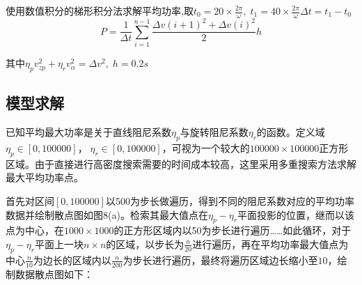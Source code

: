 \documentclass{article}
\numberwithin{equation}{subsection}
\begin{document}
使用数值积分的梯形积分法求解平均功率,取$t_0=20 \times \frac{2 \pi}{\omega}, \; t_{1}=40 \times \frac{2 \pi}{\omega}\Delta t=t_1-t_0$
\begin{equation}
P=\frac{1}{\Delta t}\sum\limits_{i=1}^{n-1}\frac{\Delta v(i+1)^2+\Delta v(i)^2}{2}h
\end{equation}

其中$\eta_p v_{zp}^2+\eta_r v_{\alpha}^2=\Delta v^2,\;h=0.2s$
\subsection{模型求解}


已知平均最大功率是关于直线阻尼系数$\eta _p$与旋转阻尼系数$\eta _r$的函数。定义域$\eta_p \in [0,100000]$，$\;\eta _r\in [0,100000]$，可视为一个较大的$100000\times 100000$正方形区域。由于直接进行高密度搜索需要的时间成本较高，这里采用多重搜索方法求解最大平均功率点。

首先对区间$[0,100000]$以500为步长做遍历，得到不同的阻尼系数对应的平均功率数据并绘制散点图如图8(a)。检索其最大值点在$\eta_p-\eta_r$平面投影的位置，继而以该点为中心，在$1000\times1000$的正方形区域内以50为步长进行遍历……如此循环，对于$\eta_p-\eta_r$平面上一块$n\times n$的区域，以步长为$\frac{n}{20}$进行遍历，再在平均功率最大值点为中心$\frac{n}{10}$为边长的区域内以$\frac{n}{200}$为步长进行遍历，最终将遍历区域边长缩小至$10$，绘制数据散点图如下：
\end{document}
